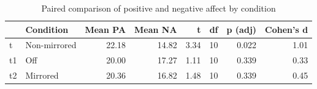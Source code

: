 \begin{table}[!h]
\centering
\caption{\label{tab:tab:pa_vs_na}Paired comparison of positive and negative affect by condition}
\centering
\begin{tabular}[t]{llrrrrrr}
\toprule
  & Condition & Mean PA & Mean NA & t & df & p (adj) & Cohen's d\\
\midrule
t & Non-mirrored & 22.18 & 14.82 & 3.34 & 10 & 0.022 & 1.01\\
t1 & Off & 20.00 & 17.27 & 1.11 & 10 & 0.339 & 0.33\\
t2 & Mirrored & 20.36 & 16.82 & 1.48 & 10 & 0.339 & 0.45\\
\bottomrule
\end{tabular}
\end{table}
